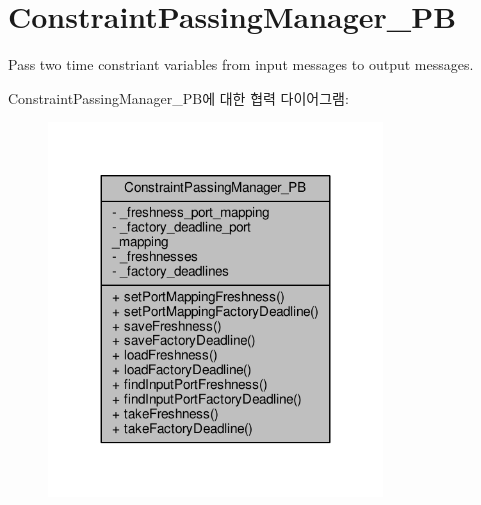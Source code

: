 \hypertarget{classConstraintPassingManager__PB}{}\section{Constraint\+Passing\+Manager\+\_\+\+PB}
\label{classConstraintPassingManager__PB}


Pass two time constriant variables from input messages to output messages.  




Constraint\+Passing\+Manager\+\_\+\+P\+B에 대한 협력 다이어그램\+:\nopagebreak
\begin{figure}[H]
\begin{center}
\leavevmode
\includegraphics[width=251pt]{classConstraintPassingManager__PB__coll__graph}
\end{center}
\end{figure}
